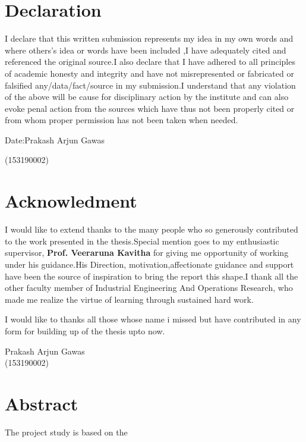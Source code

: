\documentclass[11pt,a4paper,oneside]{report}
\date{}
\begin{document}

\chapter*{Declaration}
I declare that this written submission represents my idea in my own words and where others's idea or words have been included ,I have adequately cited and referenced the original source.I also declare that I have adhered to all principles of academic honesty and integrity and have not misrepresented or fabricated or falsified any/data/fact/source in my submission.I understand that any violation of the above will be cause for disciplinary action by the institute and can also evoke penal action from the sources which have thus not been properly cited or from whom proper permission has not been taken when needed.
\vspace{1cm}


\noindent Date:\hfill Prakash Arjun Gawas                     
\begin{flushright}(153190002)\end{flushright}
\chapter*{Acknowledment}
I would like to extend thanks to the many people who so generously contributed to the work presented in the thesis.Special mention goes to my enthusiastic supervisor, \textbf{Prof. Veeraruna Kavitha} for giving me opportunity of working under his guidance.His Direction, motivation,affectionate guidance and support have been the source of inspiration to bring the report this shape.I thank all the other faculty member of Industrial Engineering And Operations Research, who made me realize the virtue of learning through sustained hard work.
\vspace{6mm}

\noindent I would like to thanks all those whose name i missed but have contributed in any form for building up of the thesis upto now.
\vspace{1cm}

\begin{flushright}
Prakash Arjun Gawas\\
(153190002)
\end{flushright}

\chapter*{Abstract}
The project study is based on the
\tableofcontents
\listoffigures
\listoftables
\end{document}
